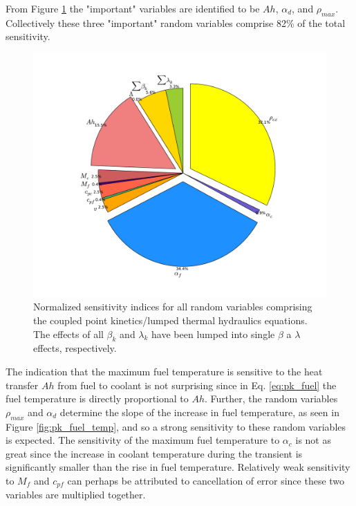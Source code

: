 From Figure \ref{fig:pk_importance_pie} the "important" variables are identified to be $Ah$, $\alpha_d$, and $\rho_{max}$. Collectively these three "important" random variables comprise 82\% of the total sensitivity. 
\begin{figure}[!htb]
\caption[Normalized sensitivity indices for random variables comprising the coupled point kinetics/lumped thermal hydraulics equations.]{ \label{fig:pk_importance_pie}
Normalized sensitivity indices for all random variables comprising the coupled point kinetics/lumped thermal hydraulics equations. The effects of all $\beta_k$ and $\lambda_k$ have been lumped into single $\beta$ a $\lambda$ effects, respectively. 
}
 \begin{center}
  \includegraphics[scale=.5]{./Chapter3/pk_importance_pie.pdf}
 \end{center}
\end{figure}
The indication that the maximum fuel temperature is sensitive to the heat transfer $Ah$ from fuel to coolant is not surprising since in Eq. \ref{eq:pk_fuel} the fuel temperature is directly proportional to $Ah$. Further, the random variables $\rho_{max}$ and $\alpha_d$ determine the slope of the increase in fuel temperature, as seen in Figure \ref{fig:pk_fuel_temp}, and so a strong sensitivity to these random variables is expected. The sensitivity of the maximum fuel temperature to $\alpha_c$ is not as great since the increase in coolant temperature during the transient is significantly smaller than the rise in fuel temperature. Relatively weak sensitivity to $M_f$ and $c_{pf}$ can perhaps be attributed to cancellation of error since these two variables are multiplied together.

